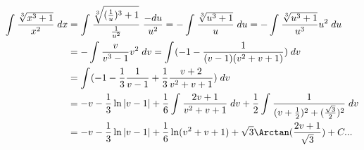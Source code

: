 {{\begin{align*}\ensuremath
\int_{}^{}\frac{\sqrt[3]{x^3+1}}{x^2}\;dx&=\int_{}^{}\frac{\sqrt[3]{(\frac{1}{u})^3+1}}{\frac{1}{u^2}}\;\frac{-du}{u^2}=-\int_{}^{}\frac{\sqrt[3]{u^3+1}}{u}\;du=-\int_{}^{}\frac{\sqrt[3]{u^3+1}}{u^3}u^2\;du\\
 &=-\int_{}^{}\frac{v}{v^3-1}v^2\;dv=\int_{}^{}(-1-\frac{1}{(v-1)(v^2+v+1)})\;dv\\
 &=\int_{}^{}(-1-\frac{1}{3}\frac{1}{v-1}+\frac{1}{3}\frac{v+2}{v^2+v+1})\;dv\\
 &=-v-\frac{1}{3}\ln|v-1|+\frac{1}{6}\int_{}^{}\frac{2v+1}{v^2+v+1}\;dv+\frac{1}{2}\int_{}^{}\frac{1}{(v+\frac{1}{2})^2+(\frac{\sqrt{3}}{2})^2}\;dv\\
 &=-v-\frac{1}{3}\ln|v-1|+\frac{1}{6}\ln(v^2+v+1)+\sqrt{3}\Arctan(\frac{2v+1}{\sqrt{3}})+C...
\end{align*}
}
}
